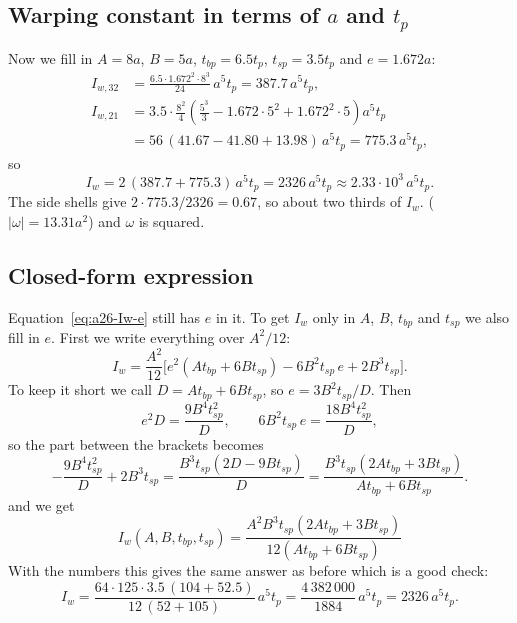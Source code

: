 \subsection{Warping constant in terms of $a$ and $t_p$}

Now we fill in $A=8a$, $B=5a$, $t_{bp}=6.5t_p$, $t_{sp}=3.5t_p$ and $e=1.672a$:
\begin{align}
  I_{w,32} &= \frac{6.5\cdot1.672^2\cdot8^3}{24}\,a^5t_p = 387.7\,a^5t_p,\\
  I_{w,21} &= 3.5\cdot\frac{8^2}{4}\left(\frac{5^3}{3} - 1.672\cdot5^2 + 1.672^2\cdot5\right)a^5t_p \nonumber\\
           &= 56\,(41.67 - 41.80 + 13.98)\,a^5t_p = 775.3\,a^5t_p,
\end{align}
so
\begin{equation}
  I_w = 2\,(387.7 + 775.3)\,a^5t_p = 2326\,a^5t_p \approx 2.33\cdot10^3\,a^5t_p .
\end{equation}
The side shells give $2\cdot775.3/2326 = 0.67$, so about two thirds of $I_w$.
($|\omega| = 13.31a^2$) and $\omega$ is squared.

\subsection{Closed-form expression}

Equation~\eqref{eq:a26-Iw-e} still has $e$ in it. To get $I_w$ only in $A$, $B$,
$t_{bp}$ and $t_{sp}$ we also fill in $e$. First we write everything over
$A^2/12$:
\begin{equation}
  I_w = \frac{A^2}{12}\Big[e^2\left(A t_{bp} + 6B t_{sp}\right) - 6B^2 t_{sp}\,e + 2B^3 t_{sp}\Big] .
\end{equation}
To keep it short we call $D = A t_{bp} + 6B t_{sp}$, so $e = 3B^2 t_{sp}/D$.
Then
\begin{equation}
  e^2 D = \frac{9B^4 t_{sp}^2}{D},\qquad 6B^2 t_{sp}\,e = \frac{18B^4 t_{sp}^2}{D},
\end{equation}
so the part between the brackets becomes
\begin{equation}
  -\frac{9B^4 t_{sp}^2}{D} + 2B^3 t_{sp}
  = \frac{B^3 t_{sp}\left(2D - 9B t_{sp}\right)}{D}
  = \frac{B^3 t_{sp}\left(2A t_{bp} + 3B t_{sp}\right)}{A t_{bp} + 6B t_{sp}} .
\end{equation}
and we get
\begin{equation}
  \boxed{\;I_w(A,B,t_{bp},t_{sp}) = \frac{A^2 B^3 t_{sp}\left(2A t_{bp} + 3B t_{sp}\right)}{12\left(A t_{bp} + 6B t_{sp}\right)}\;}
  \label{eq:a26-Iw}
\end{equation}
With the numbers this gives the same answer as before which is a good check:
\begin{equation}
  I_w = \frac{64\cdot125\cdot3.5\,(104+52.5)}{12\,(52+105)}\,a^5t_p
      = \frac{4\,382\,000}{1884}\,a^5t_p = 2326\,a^5t_p .
\end{equation}

